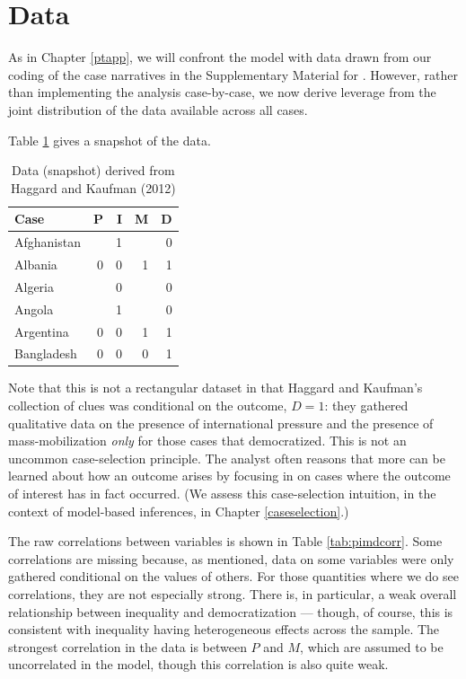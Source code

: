 \documentclass[
  12pt,
]{book}
\begin{document}
\hypertarget{data}{%
\section{Data}\label{data}}

As in Chapter \ref{ptapp}, we will confront the model with data drawn from our coding of the case narratives in the Supplementary Material for \citet{haggard2012inequality}. However, rather than implementing the analysis case-by-case, we now derive leverage from the joint distribution of the data available across all cases.

Table \ref{tab:data82} gives a snapshot of the data.

\begin{table}

\caption{\label{tab:data82}Data (snapshot) derived from Haggard and Kaufman (2012)}
\centering
\begin{tabular}[t]{l|r|r|r|r}
\hline
Case & P & I & M & D\\
\hline
Afghanistan &  & 1 &  & 0\\
\hline
Albania & 0 & 0 & 1 & 1\\
\hline
Algeria &  & 0 &  & 0\\
\hline
Angola &  & 1 &  & 0\\
\hline
Argentina & 0 & 0 & 1 & 1\\
\hline
Bangladesh & 0 & 0 & 0 & 1\\
\hline
\end{tabular}
\end{table}

Note that this is not a rectangular dataset in that Haggard and Kaufman's collection of clues was conditional on the outcome, \(D=1\): they gathered qualitative data on the presence of international pressure and the presence of mass-mobilization \emph{only} for those cases that democratized. This is not an uncommon case-selection principle. The analyst often reasons that more can be learned about how an outcome arises by focusing in on cases where the outcome of interest has in fact occurred. (We assess this case-selection intuition, in the context of model-based inferences, in Chapter \ref{caseselection}.)

The raw correlations between variables is shown in Table \ref{tab:pimdcorr}. Some correlations are missing because, as mentioned, data on some variables were only gathered conditional on the values of others. For those quantities where we do see correlations, they are not especially strong. There is, in particular, a weak overall relationship between inequality and democratization --- though, of course, this is consistent with inequality having heterogeneous effects across the sample. The strongest correlation in the data is between \(P\) and \(M\), which are assumed to be uncorrelated in the model, though this correlation is also quite weak.
\end{document}
